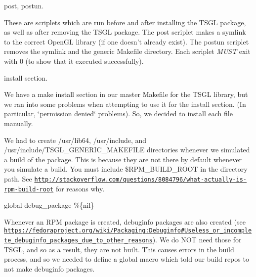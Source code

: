 \begin{DoxyItemize}
\item {\ttfamily post}, {\ttfamily postun}.
\begin{DoxyItemize}
\item These are scriplets which are run before and after installing the T\-S\-G\-L package, as well as after removing the T\-S\-G\-L package. The {\ttfamily post} scriplet makes a symlink to the correct Open\-G\-L library (if one doesn't already exist). The {\ttfamily postun} scriplet removes the symlink and the generic Makefile directory. Each scriplet {\itshape M\-U\-S\-T} exit with 0 (to show that it executed successfully).
\end{DoxyItemize}
\item {\ttfamily install} section.
\begin{DoxyItemize}
\item We have a make install section in our master Makefile for the T\-S\-G\-L library, but we ran into some problems when attempting to use it for the install section. (In particular, \char`\"{}permission denied\char`\"{} problems). So, we decided to install each file manually.
\item We had to create {\ttfamily /usr/lib64}, {\ttfamily /usr/include}, and {\ttfamily /usr/include/\-T\-S\-G\-L\-\_\-\-G\-E\-N\-E\-R\-I\-C\-\_\-\-M\-A\-K\-E\-F\-I\-L\-E} directories whenever we simulated a build of the package. This is because they are not there by default whenever you simulate a build. You must include {\ttfamily \$\-R\-P\-M\-\_\-\-B\-U\-I\-L\-D\-\_\-\-R\-O\-O\-T} in the directory path. See \href{http://stackoverflow.com/questions/8084796/what-actually-is-rpm-build-root}{\tt http\-://stackoverflow.\-com/questions/8084796/what-\/actually-\/is-\/rpm-\/build-\/root} for reasons why.
\end{DoxyItemize}
\item {\ttfamily global debug\-\_\-package \%\{nil\}}
\begin{DoxyItemize}
\item Whenever an R\-P\-M package is created, debuginfo packages are also created (see \href{https://fedoraproject.org/wiki/Packaging:Debuginfo#Useless_or_incomplete_debuginfo_packages_due_to_other_reasons}{\tt https\-://fedoraproject.\-org/wiki/\-Packaging\-:\-Debuginfo\#\-Useless\-\_\-or\-\_\-incomplete\-\_\-debuginfo\-\_\-packages\-\_\-due\-\_\-to\-\_\-other\-\_\-reasons}). We do N\-O\-T need those for T\-S\-G\-L, and so as a result, they are not built. This causes errors in the build process, and so we needed to define a global macro which told our build repos to not make debuginfo packages.

\end{DoxyItemize}
\end{DoxyItemize}

